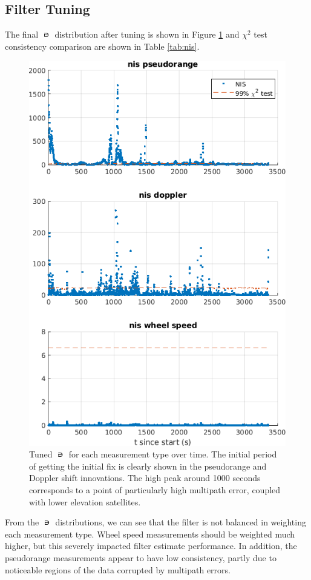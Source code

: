 \documentclass[letterpaper,times]{IONconf}
\begin{document}
\subsection{Filter Tuning}
The final $\nis$ distribution after tuning is shown in Figure \ref{fig:nis} and $\chi^2$ test consistency comparison are shown in Table \ref{tab:nis}.

\begin{figure}
    \centering
    \includegraphics[width=.6\textwidth]{nis}
    \caption{Tuned $\nis$ for each measurement type over time. The initial period of getting the initial fix is clearly shown in the pseudorange and Doppler shift innovations. The high peak around 1000 seconds corresponds to a point of particularly high multipath error, coupled with lower elevation satellites.}\label{fig:nis}
\end{figure}


From the $\nis$ distributions, we can see that the filter is not balanced in weighting each measurement type. Wheel speed measurements should be weighted much higher, but this severely impacted filter estimate performance. In addition, the pseudorange measurements appear to have low consistency, partly due to noticeable regions of the data corrupted by multipath errors.
\end{document}
